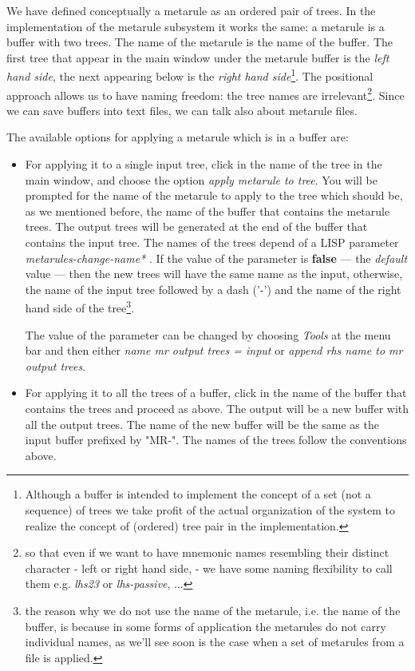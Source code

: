 We have defined conceptually a metarule as an ordered pair of trees. 
In the implementation
of the metarule subsystem it works the same: a metarule is a buffer with two
trees. The name of the metarule is the name of the buffer. The first tree that
appear in the main window under the metarule 
buffer is the {\it left hand side},
the next appearing below is the {\it right hand side}\footnote{Although a 
buffer is intended to implement the concept of a set (not a sequence) of trees
we take profit of the actual organization of the system to realize the
concept of (ordered) tree pair in the implementation.}. 
The positional approach allows us
to have naming freedom: the tree names
are irrelevant\footnote{so that even if we want to have mnemonic names 
resembling their distinct character - left or right hand side, - we have some
naming flexibility to call them e.g. {\it lhs23} or {\it lhs-passive}, ...}.
Since we can save buffers into text files, we can talk also about metarule
files.

The available options for applying a metarule which is in a buffer are:

\begin{itemize}
\item	For applying it to a single input tree, click in the name of the
	tree in the main window, and choose the option 
	{\it apply metarule to tree}. 
	You will be prompted for the name of the metarule
	to apply to the tree
	which should be, as we mentioned before, the name of the buffer that
	contains the metarule trees. The output trees will be generated
	at the end of the buffer that contains the input tree. The names of
	the trees depend of a LISP parameter {\it *metarules-change-name* }.
	If the value of the parameter is {\bf false} --- the {\it default} 
	value --- then the new trees will have the same name as the input, 
	otherwise, the name of the input tree followed by a dash ('-') and
	the name of the right hand side of the tree\footnote{the reason why 
	we do not use the name of the metarule, i.e. the name of the buffer,
	is because in some forms of application the metarules do not
	carry individual names, as we'll see soon is the case when a set of
	metarules from a file is applied.}.

	The value of the parameter can be changed by choosing {\it Tools} 
	at the menu bar and then either {\it name mr output trees =
	input}  or {\it append rhs name to mr output trees}.

	
\item	For applying it to all the trees of a buffer, click in the name of the 
	buffer that contains the trees and proceed as above. The output will
	be a new buffer with all the output trees. The name of the new buffer
	will be the same as the input buffer prefixed by "MR-". The names of
	the trees follow the conventions above.

\end{itemize}

